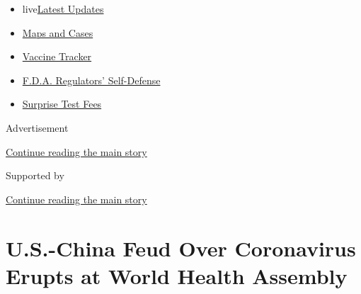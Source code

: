 \begin{itemize}
\tightlist
\item
  live\href{https://www.nytimes3xbfgragh.onion/2020/09/11/world/covid-19-coronavirus.html?name=styln-coronavirus-national\&region=TOP_BANNER\&block=storyline_menu_recirc\&action=click\&pgtype=Article\&impression_id=81b3b560-f4ce-11ea-be21-1dfd0b108786\&variant=undefined}{Latest
  Updates}
\item
  \href{https://www.nytimes3xbfgragh.onion/interactive/2020/us/coronavirus-us-cases.html?name=styln-coronavirus-national\&region=TOP_BANNER\&block=storyline_menu_recirc\&action=click\&pgtype=Article\&impression_id=81b3b561-f4ce-11ea-be21-1dfd0b108786\&variant=undefined}{Maps
  and Cases}
\item
  \href{https://www.nytimes3xbfgragh.onion/interactive/2020/science/coronavirus-vaccine-tracker.html?name=styln-coronavirus-national\&region=TOP_BANNER\&block=storyline_menu_recirc\&action=click\&pgtype=Article\&impression_id=81b3b562-f4ce-11ea-be21-1dfd0b108786\&variant=undefined}{Vaccine
  Tracker}
\item
  \href{https://www.nytimes3xbfgragh.onion/2020/09/10/us/politics/fda-coronavirus-vaccine.html?name=styln-coronavirus-national\&region=TOP_BANNER\&block=storyline_menu_recirc\&action=click\&pgtype=Article\&impression_id=81b3b563-f4ce-11ea-be21-1dfd0b108786\&variant=undefined}{F.D.A.
  Regulators' Self-Defense}
\item
  \href{https://www.nytimes3xbfgragh.onion/2020/09/09/upshot/coronavirus-surprise-test-fees.html?name=styln-coronavirus-national\&region=TOP_BANNER\&block=storyline_menu_recirc\&action=click\&pgtype=Article\&impression_id=81b3b564-f4ce-11ea-be21-1dfd0b108786\&variant=undefined}{Surprise
  Test Fees}
\end{itemize}

Advertisement

\protect\hyperlink{after-top}{Continue reading the main story}

Supported by

\protect\hyperlink{after-sponsor}{Continue reading the main story}

\hypertarget{us-china-feud-over-coronavirus-erupts-at-world-health-assembly}{%
\section{U.S.-China Feud Over Coronavirus Erupts at World Health
Assembly}\label{us-china-feud-over-coronavirus-erupts-at-world-health-assembly}}

